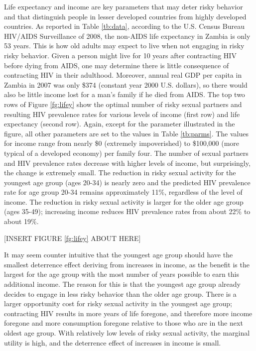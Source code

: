 \documentclass[12pt]{article}
\begin{document}
Life expectancy and income are key parameters that may deter risky behavior and that distinguish people in lesser developed countries from highly developed countries.  As reported in Table \ref{tb:data}, according to the U.S. Census Bureau HIV/AIDS Surveillance of 2008, the non-AIDS life expectancy in Zambia is only 53 years.  This is how old adults may expect to live when not engaging in risky risky behavior.  Given a person might live for 10 years after contracting HIV before dying from AIDS, one may determine there is little consequence of contracting HIV in their adulthood.  Moreover, annual real GDP per capita in Zambia in 2007 was only \$374 (constant year 2000 U.S. dollars), so there would also be little income lost for a man's family if he died from AIDS.  The top two rows of Figure \ref{fg:lifey} show the optimal number of risky sexual partners and resulting HIV prevalence rates for various levels of income (first row) and life expectancy (second row).  Again, except for the parameter illustrated in the figure, all other parameters are set to the values in Table \ref{tb:parms}.  The values for income range from nearly \$0 (extremely impoverished) to \$100,000 (more typical of a developed economy) per family four.  The number of sexual partners and HIV prevalence rates decrease with higher levels of income, but surprisingly, the change is extremely small.  The reduction in risky sexual activity for the youngest age group (ages 20-34) is nearly zero and the predicted HIV prevalence rate for age group 20-34 remains approximately 11\%, regardless of the level of income.  The reduction in risky sexual activity is larger for the older age group (ages 35-49); increasing income reduces HIV prevalence rates from about 22\% to about 19\%.

\begin{center}[INSERT FIGURE \ref{fg:lifey} ABOUT HERE]\end{center}

It may seem counter intuitive that the youngest age group should have the smallest deterrence effect deriving from increases in income, as the benefit is the largest for the age group with the most number of years possible to earn this additional income.  The reason for this is that the youngest age group already decides to engage in less risky behavior than the older age group.  There is a larger opportunity cost for risky sexual activity in the youngest age group; contracting HIV results in more years of life foregone, and therefore more income foregone and more consumption foregone relative to those who are in the next oldest age group.  With relatively low levels of risky sexual activity, the marginal utility is high, and the deterrence effect of increases in income is small.
\end{document}
